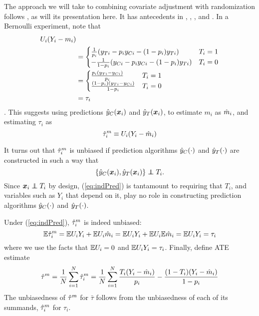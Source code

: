The approach we will take to combining covariate adjustment with
randomization follows \citet{loop}, as will its presentation here.
It has antecedents in \citet{rosenbaum2002covariance},
\citet{aronowMiddleton}, \citet{wager2016high}, and \citet{tame}.
In a Bernoulli experiment, note that
\begin{align*}
U_i(Y_i-m_i)&\\
&=\begin{cases}
\frac{1}{p_i}(y_{Ti}-p_iy_{Ci}-(1-p_i)y_{Ti})&T_i=1\\
-\frac{1}{1-p_i}(y_{Ci}-p_iy_{Ci}-(1-p_i)y_{Ti})&T_i=0 \end{cases}\\
&=\begin{cases}
\frac{p_i(y_{Ti}-y_{Ci})}{p_i}&T_i=1\\
\frac{(1-p_i)(y_{Ti}-y_{Ci})}{1-p_i}&T_i=0
\end{cases}\\
&=\tau_i
\end{align*}.
This suggests using predictions $\hat{y}_C(\bm{x}_i)$ and $\hat{y}_T(\bm{x}_i)$, to estimate $m_i$ as
$\hat{m}_i$,
and estimating $\tau_i$ as
\begin{equation*}
\hat{\tau}_i^m\equiv U_i(Y_i-\hat{m}_i)
\end{equation*}

It turns out that $\hat{\tau}_i^m$ is unbiased if prediction algorithms $\hat{y}_C(\cdot)$ and $\hat{y}_T(\cdot)$
are constructed in such a way that
\begin{equation}\label{eq:indPred}
\{\predcx,\predtx\}\independent T_i.
\end{equation}
Since $\bm{x}_i\independent T_i$ by design, (\ref{eq:indPred}) is
tantamount to requiring that $T_i$, and variables such as $Y_i$ that
depend on it, play no role in constructing prediction algorithms $\hat{y}_C(\cdot)$ and
$\hat{y}_T(\cdot)$.

Under (\ref{eq:indPred}), $\hat{\tau}_i^m$ is indeed unbiased:
\begin{equation}
\mathbb{E} \hat{\tau}_i^m=\mathbb{E} U_iY_i+\mathbb{E} U_i\hat{m}_i=\mathbb{E} U_iY_i+\mathbb{E} U_i\mathbb{E}\hat{m}_i=\mathbb{E}
U_iY_i=\tau_i
\end{equation}
where we use the facts that $\mathbb{E} U_i=0$ and $\mathbb{E} U_iY_i=\tau_i$.
Finally, define ATE estimate
\begin{equation} \label{eq:thm}
\hat{\tau}^m=\frac{1}{N}\displaystyle\sum_{i=1}^N
\hat{\tau}_i^m=\frac{1}{N}\displaystyle\sum_{i=1}^N
\frac{T_i(Y_i-\hat{m}_i)}{p_i}-\frac{(1-T_i)(Y_i-\hat{m}_i)}{1-p_i}
\end{equation}
The unbiasedness of $\hat{\tau}^m$ for $\bar{\tau}$ follows from the
unbiasedness of each of its summands, $\hat{\tau}_i^m$ for $\tau_i$.

